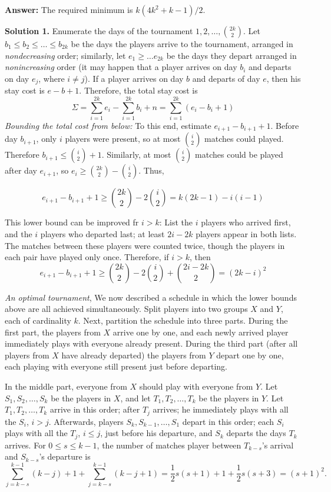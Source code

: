 \documentclass[a4paper, 12pt]{article}
\begin{document}
\begin{enumerate}
 \textbf{Answer: } The required minimum is $k(4k^2 + k - 1)/2$.
 
 \textbf{Solution 1.} Enumerate the days of the tournament $1, 2, \dots, \binom{2k}{2}$. Let $b_1 \leq b_2 \leq \dots \leq b_{2k}$ be the days the players arrive to the tournament, arranged in \textit{nondecreasing} order; similarly, let $e_1 \geq \dots e_{2k}$ be the days they depart arranged in \textit{nonincreasing} order (it may happen that a player arrives on day $b_i$ and departs on day $e_j$, where $i \not = j$). If a player arrives on day $b$ and departs of day $e$, then his stay cost is $e-b+1$. Therefore, the total stay cost is
 $$
 \Sigma = \sum_{i=1}^{2k} e_i - \sum_{i=1}^{2k} b_i + n = \sum_{i=1}^{2k} (e_i - b_i + 1)
 $$
\textit{Bounding the total cost from below:} To this end, estimate $e_{i+1} - b_{i+1} + 1$. Before day $b_{i+1}$, only $i$ players were present, so at most $\binom{i}{2}$ matches could played. Therefore $b_{i+1} \leq \binom{i}{2} + 1$. Similarly, at most $\binom{i}{2}$ matches could be played after day $e_{i+1}$, so $e_i \geq \binom{2k}{2} - \binom{i}{2}$. Thus,

$$
e_{i+1} - b_{i+1} + 1 \geq \binom{2k}{2} - 2 \binom{i}{2} = k(2k-1) - i(i-1)
$$

This lower bound can be improved fr $i > k$: List the $i$ players who arrived first, and the $i$ players who departed last; at least $2i-2k$ players appear in both lists. The matches between these players were counted twice, though the players in each pair have played only once. Therefore, if $i > k$, then
$$
e_{i+1} - b_{i+1} + 1 \geq \binom{2k}{2} - 2 \binom{i}{2} + \binom{2i-2k}{2} = (2k-i)^2
$$

\textit{An optimal tournament}, We now described a schedule in which the lower bounds above are all achieved simultaneously. Split players into two groups $X$ and $Y$, each of cardinality $k$. Next, partition the schedule into three parts.  During the first part, the players from $X$ arrive one by one, and each newly arrived player immediately plays with everyone already present. During the third part (after all players from $X$ have already departed) the players from $Y$ depart one by one, each playing with everyone still present just before departing.

In the middle part, everyone from $X$ should play with everyone from $Y$. Let $S_1, S_2, \dots, S_k$ be the players in $X$, and let $T_1, T_2, \dots, T_k$ be the players in $Y$. Let $T_1, T_2, \dots, T_k$ arrive in this order; after $T_j$ arrives; he immediately plays with all the $S_i$, $i > j$. Afterwards, players $S_k, S_{k-1}, \dots, S_1$ depart in this order; each $S_i$ plays with all the $T_{j}$, $i \leq j$, just before his departure, and $S_k$ departs the days $T_k$ arrives. For $0 \leq s \leq k-1$, the number of matches player between $T_{k-s}$'s arrival and $S_{k-s}$'s departure is
$$
\sum_{j=k-s}^{k-1} (k-j) + 1 + \sum_{j=k-s}^{k-1} (k-j+1) = \frac{1}{2} s(s+1) + 1 + \frac{1}{2}s(s+3) = (s+1)^2.
$$


\end{enumerate}
\end{document}
